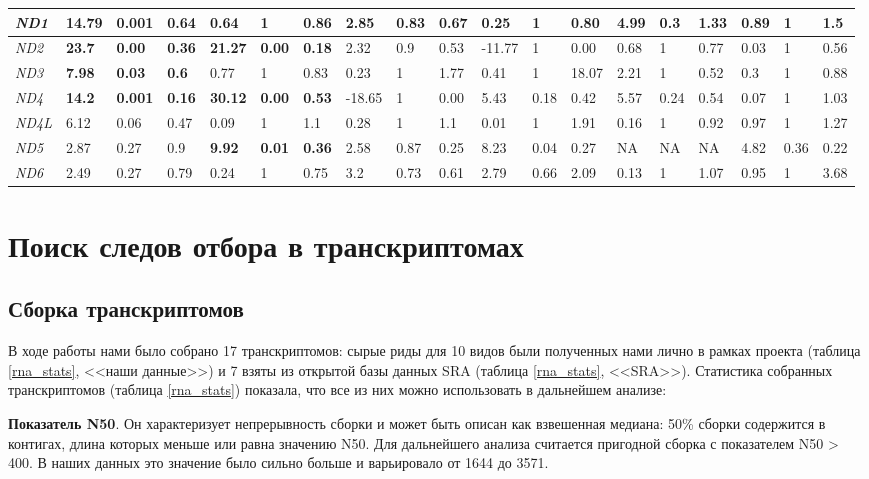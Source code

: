 \begin{landscape}
\begin{table}[]
\begin{tabular}{|l|l|l|l|l|l|l|l|l|l|l|l|l|l|l|l|l|l|l|}
		\textit{ND1} & \textbf{14.79} & \textbf{0.001} & \textbf{0.64} & 0.64 & 1 & 0.86 & 2.85 & 0.83 & 0.67 & 0.25 & 1 & 0.80 & 4.99 & 0.3 & 1.33 & 0.89 & 1 & 1.5 \\ \hline
		\textit{ND2} & \textbf{23.7} & \textbf{0.00} & \textbf{0.36} & \textbf{21.27} & \textbf{0.00} & \textbf{0.18} & 2.32 & 0.9 & 0.53 & -11.77 & 1 & 0.00 & 0.68 & 1 & 0.77 & 0.03 & 1 & 0.56 \\ \hline
		\textit{ND3} & \textbf{7.98} & \textbf{0.03} & \textbf{0.6} & 0.77 & 1 & 0.83 & 0.23 & 1 & 1.77 & 0.41 & 1 & 18.07 & 2.21 & 1 & 0.52 & 0.3 & 1 & 0.88 \\ \hline
		\textit{ND4} & \textbf{14.2} & \textbf{0.001} & \textbf{0.16} & \textbf{30.12} & \textbf{0.00} & \textbf{0.53} & -18.65 & 1 & 0.00 & 5.43 & 0.18 & 0.42 & 5.57 & 0.24 & 0.54 & 0.07 & 1 & 1.03 \\ \hline
		\textit{ND4L} & 6.12 & 0.06 & 0.47 & 0.09 & 1 & 1.1 & 0.28 & 1 & 1.1 & 0.01 & 1 & 1.91 & 0.16 & 1 & 0.92 & 0.97 & 1 & 1.27 \\ \hline
		\textit{ND5} & 2.87 & 0.27 & 0.9 & \textbf{9.92} & \textbf{0.01} & \textbf{0.36} & 2.58 & 0.87 & 0.25 & 8.23 & 0.04 & 0.27 & NA & NA & NA & 4.82 & 0.36 & 0.22 \\ \hline
		\textit{ND6} & 2.49 & 0.27 & 0.79 & 0.24 & 1 & 0.75 & 3.2 & 0.73 & 0.61 & 2.79 & 0.66 & 2.09 & 0.13 & 1 & 1.07 & 0.95 & 1 & 3.68 \\ \hline
	\end{tabular}
\end{table}

\end{landscape}

\section{Поиск следов отбора в транскриптомах}

\subsection{Сборка транскриптомов}

В ходе работы нами было собрано 17 транскриптомов: сырые риды для 10 видов были полученных нами лично в рамках проекта (таблица \ref{rna_stats}, <<наши данные>>) и 7 взяты из  открытой базы данных SRA (таблица \ref{rna_stats}, <<SRA>>). Статистика собранных транскриптомов (таблица \ref{rna_stats}) показала, что все из них можно использовать в дальнейшем анализе:

\textbf{Показатель N50}. Он характеризует непрерывность сборки и может быть описан как взвешенная медиана: 50\% сборки содержится в контигах, длина которых меньше или равна значению N50. Для дальнейшего анализа считается пригодной сборка с показателем N50 > 400. В наших данных это значение было сильно больше и варьировало от 1644 до 3571. 
	
